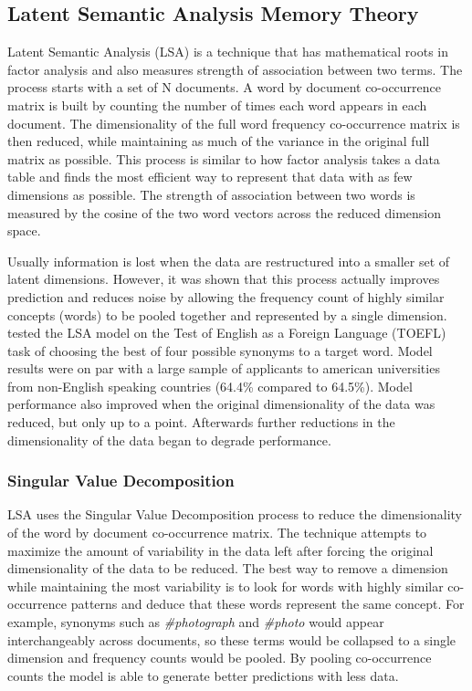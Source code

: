 \documentclass[man,floatsintext,donotrepeattitle]{apa6}
\begin{document}
\subsection{Latent Semantic Analysis Memory Theory}

Latent Semantic Analysis \parencite{Landauer1997} (LSA) is a technique that has mathematical roots in factor analysis and also measures strength of association between two terms.
The process starts with a set of N documents.
A word by document co-occurrence matrix is built by counting the number of times each word appears in each document.
The dimensionality of the full word frequency co-occurrence matrix is then reduced, while maintaining as much of the variance in the original full matrix as possible.
This process is similar to how factor analysis takes a data table and finds the most efficient way to represent that data with as few dimensions as possible.
The strength of association between two words is measured by the cosine of the two word vectors across the reduced dimension space.

Usually information is lost when the data are restructured into a smaller set of latent dimensions.
However, it was shown that this process actually improves prediction and reduces noise by allowing the frequency count of highly similar concepts (words) to be pooled together and represented by a single dimension.
\textcite{Landauer1997} tested the LSA model on the Test of English as a Foreign Language (TOEFL) task of choosing the best of four possible synonyms to a target word.
Model results were on par with a large sample of applicants to american universities from non-English speaking countries (\num{64.4}\% compared to \num{64.5}\%).
Model performance also improved when the original dimensionality of the data was reduced, but only up to a point.
Afterwards further reductions in the dimensionality of the data began to degrade performance.

\subsubsection{Singular Value Decomposition}

LSA uses the Singular Value Decomposition process to reduce the dimensionality of the word by document co-occurrence matrix.
The technique attempts to maximize the amount of variability in the data left after forcing the original dimensionality of the data to be reduced.
The best way to remove a dimension while maintaining the most variability is to look for words with highly similar co-occurrence patterns and deduce that these words represent the same concept.
For example, synonyms such as \emph{\#photograph} and \emph{\#photo} would appear interchangeably across documents, so these terms would be collapsed to a single dimension and frequency counts would be pooled.
By pooling co-occurrence counts the model is able to generate better predictions with less data.
\end{document}
